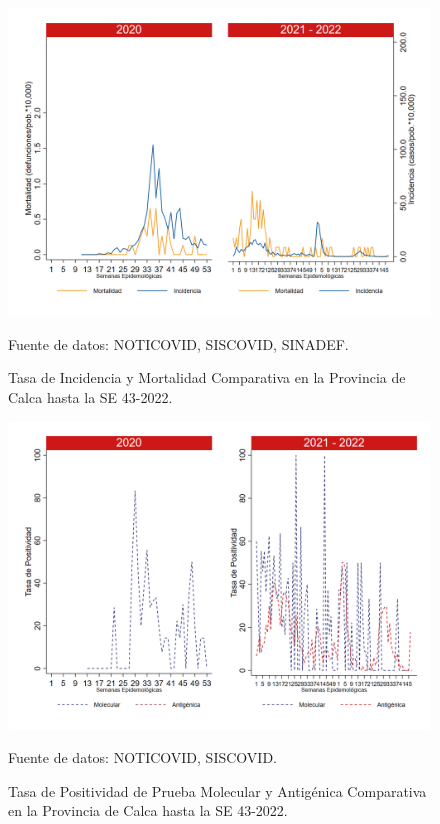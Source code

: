 \documentclass[12pt,a4paper,openany]{book}
\begin{document}
	\begin{figure}[h]
		\caption{Tasa de Incidencia y Mortalidad Comparativa en la Provincia de Calca hasta la SE 43-2022.}\label{fig:inc_mort_calca}
		\begin{center}
			\includegraphics[width=0.85\linewidth]{../figuras/incidencia_mortalidad_20_21_3.png}
		\end{center}
		{\footnotesize {Fuente de datos: NOTICOVID, SISCOVID, SINADEF.}}
	\end{figure}
	
	\begin{figure}[h]
		\caption{Tasa de Positividad de Prueba Molecular y Antigénica Comparativa en la Provincia de Calca hasta la SE 43-2022.}\label{fig:positividad_calca}
		\begin{center}
			\includegraphics[width=0.7\linewidth]{../figuras/positividad_20_21_3.png}
		\end{center}
		{\footnotesize {Fuente de datos: NOTICOVID, SISCOVID.}}
	\end{figure}
	
\end{document}
